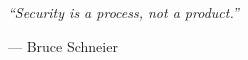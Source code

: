 \thispagestyle{empty}

\vspace*{\fill}

\begin{flushright}
    \begin{minipage}{0.65\textwidth}
        \raggedleft
        \textit{``Security is a process, not a product.''}
    
        \vspace{0.5cm}

        --- Bruce Schneier
    \end{minipage}
\end{flushright}

\vspace*{\fill}
